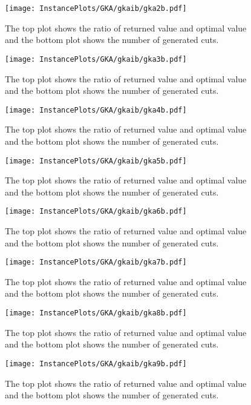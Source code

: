 \documentclass[10pt,a4paper]{article}
\begin{document}
\begin{figure}[H]
\texttt{[image: InstancePlots/GKA/gkaib/gka2b.pdf]}
\caption{The top plot shows the ratio of returned value and optimal value     and the bottom plot shows the number of generated cuts.}
\end{figure}

\begin{figure}[H]
\texttt{[image: InstancePlots/GKA/gkaib/gka3b.pdf]}
\caption{The top plot shows the ratio of returned value and optimal value     and the bottom plot shows the number of generated cuts.}
\end{figure}

\begin{figure}[H]
\texttt{[image: InstancePlots/GKA/gkaib/gka4b.pdf]}
\caption{The top plot shows the ratio of returned value and optimal value     and the bottom plot shows the number of generated cuts.}
\end{figure}

\begin{figure}[H]
\texttt{[image: InstancePlots/GKA/gkaib/gka5b.pdf]}
\caption{The top plot shows the ratio of returned value and optimal value     and the bottom plot shows the number of generated cuts.}
\end{figure}

\begin{figure}[H]
\texttt{[image: InstancePlots/GKA/gkaib/gka6b.pdf]}
\caption{The top plot shows the ratio of returned value and optimal value     and the bottom plot shows the number of generated cuts.}
\end{figure}

\begin{figure}[H]
\texttt{[image: InstancePlots/GKA/gkaib/gka7b.pdf]}
\caption{The top plot shows the ratio of returned value and optimal value     and the bottom plot shows the number of generated cuts.}
\end{figure}

\begin{figure}[H]
\texttt{[image: InstancePlots/GKA/gkaib/gka8b.pdf]}
\caption{The top plot shows the ratio of returned value and optimal value     and the bottom plot shows the number of generated cuts.}
\end{figure}

\begin{figure}[H]
\texttt{[image: InstancePlots/GKA/gkaib/gka9b.pdf]}
\caption{The top plot shows the ratio of returned value and optimal value     and the bottom plot shows the number of generated cuts.}
\end{figure}
\end{document}
